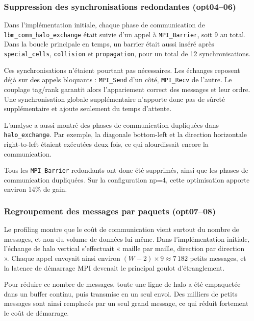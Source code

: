 \documentclass[a4paper,11pt,oneside]{report}
\newcommand{\code}[1]{\texttt{#1}}
\begin{document}
\subsubsection{Suppression des synchronisations redondantes (opt04–06)}

Dans l'implémentation initiale, chaque phase de communication de \code{lbm\_comm\_halo\_exchange}
était suivie d'un appel à \code{MPI\_Barrier}, soit 9 au total. Dans la boucle principale
en temps, un barrier était aussi inséré après \code{special\_cells}, \code{collision}
et \code{propagation}, pour un total de 12 synchronisations.

Ces synchronisations n'étaient pourtant pas nécessaires. Les échanges reposent déjà
sur des appels bloquants : \code{MPI\_Send} d'un côté, \code{MPI\_Recv} de l'autre.
Le couplage tag/rank garantit alors l'appariement correct des messages et leur ordre.
Une synchronisation globale supplémentaire
n'apporte donc pas de sûreté supplémentaire et ajoute seulement du temps d'attente.

L'analyse a aussi montré des phases de communication dupliquées dans \code{halo\_exchange}.
Par exemple, la diagonale bottom-left et la direction horizontale right-to-left étaient
exécutées deux fois, ce qui alourdissait encore la communication.

Tous les \code{MPI\_Barrier} redondants ont donc été supprimés, ainsi que les phases de communication
dupliquées. Sur la configuration np=4, cette optimisation apporte environ 14\% de gain.

\subsubsection{Regroupement des messages par paquets (opt07–08)}

Le profiling montre que le coût de communication vient surtout du nombre de messages,
et non du volume de données lui-même. Dans l'implémentation initiale, l'échange de halo
vertical s'effectuait « maille par maille, direction par direction ». Chaque appel envoyait
ainsi environ $(W-2)\times 9 \approx 7\,182$ petits messages, et la latence de démarrage MPI
devenait le principal goulot d'étranglement.

Pour réduire ce nombre de messages, toute une ligne de halo a été empaquetée dans un
buffer continu, puis transmise en un seul envoi. Des milliers de petits messages sont ainsi
remplacés par un seul grand message, ce qui réduit fortement le coût de démarrage.
\end{document}
